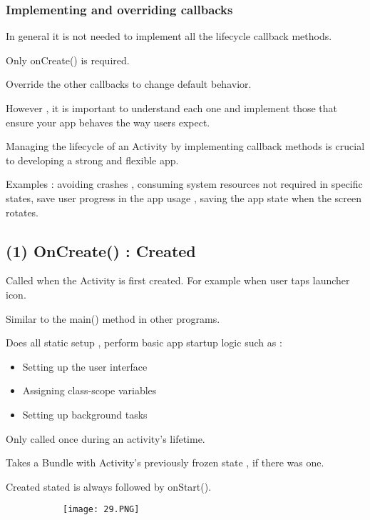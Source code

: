 \documentclass{article}
\begin{document}
\subsubsection{Implementing and overriding callbacks}

In general it is not needed to implement all the lifecycle callback methods.

Only onCreate() is required.

Override the other callbacks to change default behavior.

However , it is important to understand each one and implement those that ensure your app behaves the way users expect.

Managing the lifecycle of an Activity by implementing callback methods is crucial to developing a strong and flexible app.

Examples : avoiding crashes , consuming system resources not required in specific states, save user progress in the app usage , saving the app state when the screen rotates.

\subsection{ (1) OnCreate() : Created}

Called when the Activity is first created. For example when user taps launcher icon.

Similar to the main() method in other programs.

Does all static setup , perform basic app startup logic such as :

\begin{itemize}
    \item Setting up the user interface
    \item Assigning class-scope variables
    \item Setting up background tasks
\end{itemize}

Only called once during an activity's lifetime.

Takes a Bundle with Activity's previously frozen state , if there was one.

Created stated is always followed by onStart().


      \begin{figure}[ht!]
  \centering
  \begin{subfigure}[b]{0.5\linewidth}
    \texttt{[image: 29.PNG]}
  \end{subfigure}
  \end{figure}
\end{document}
